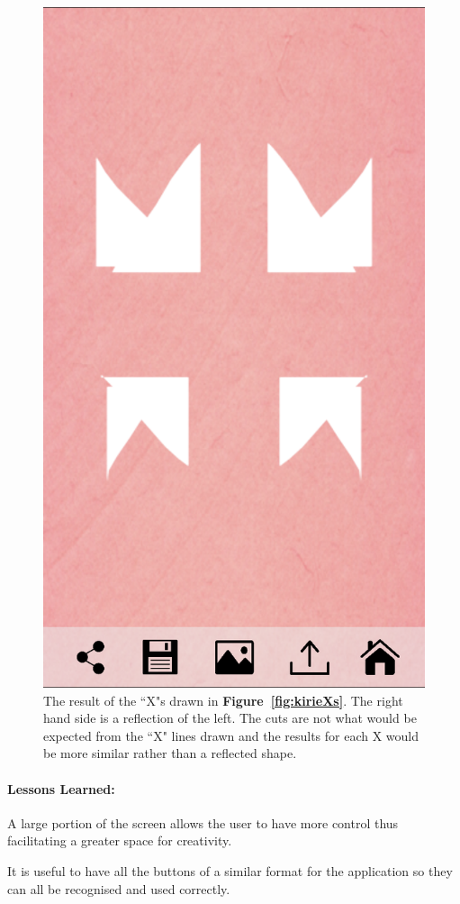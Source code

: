 \documentclass[11pt]{article}
\begin{document}
\begin{figure}[!ht]
\begin{minipage}{0.45\textwidth}
                            \includegraphics[width=0.7\linewidth]{Images/kirieCut.png}
                            \caption{The result of the ``X"s drawn in \textbf{Figure~\ref{fig:kirieXs}}. The right hand side is a reflection of the left. The cuts are not what would be expected from the ``X" lines drawn and the results for each X would be more similar rather than a reflected shape.}
                            \label{fig:kirieCut}
                        \end{minipage}
                    \end{figure}
                
                \paragraph{Lessons Learned:}    %
                A large portion of the screen allows the user to have more control thus facilitating a greater space for creativity.
                
                It is useful to have all the buttons of a similar format for the application so they can all be recognised and used correctly.
                
\end{document}
